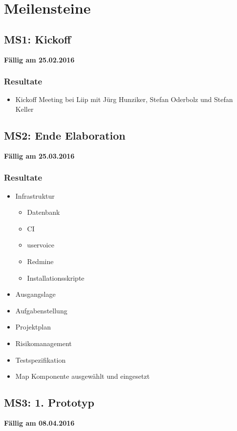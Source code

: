 \section{Meilensteine}
\subsection{MS1: Kickoff}
\label{pm-ms1}
\textbf{Fällig am 25.02.2016}
\subsubsection{Resultate}
\begin{itemize}
	\item Kickoff Meeting bei Liip mit Jürg Hunziker, Stefan Oderbolz und Stefan Keller
\end{itemize}

\subsection{MS2: Ende Elaboration}
\label{pm-ms2}
\textbf{Fällig am 25.03.2016}
\subsubsection{Resultate}
\begin{itemize}
	\item Infrastruktur
	\begin{itemize}
		\item Datenbank
		\item CI
		\item uservoice
		\item Redmine
		\item Installationsskripte
	\end{itemize}
	\item Ausgangslage
	\item Aufgabenstellung
	\item Projektplan
	\item Risikomanagement
	\item Testspezifikation
	\item Map Komponente ausgewählt und eingesetzt
\end{itemize}

\subsection{MS3: 1. Prototyp}
\label{pm-ms3}
\textbf{Fällig am 08.04.2016}
